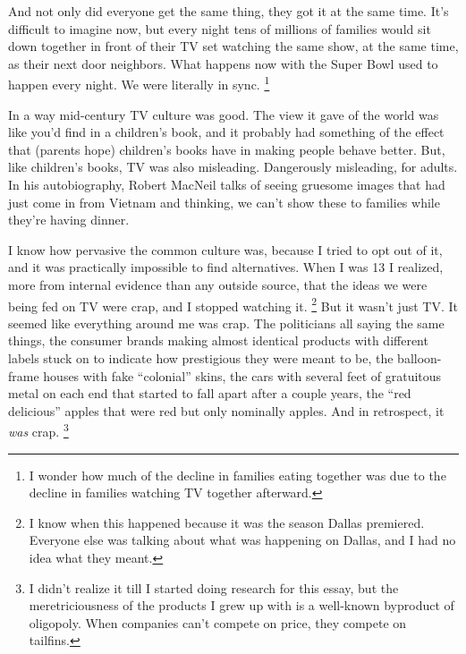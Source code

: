 And not only did everyone get the same thing, they got it at the same
time. It's difficult to imagine now, but every night tens of millions of
families would sit down together in front of their TV set watching the
same show, at the same time, as their next door neighbors. What happens
now with the Super Bowl used to happen every night. We were literally in
sync. \footnote{I wonder how much of the decline in families eating together was
due to the decline in families watching TV together afterward.}

In a way mid-century TV culture was good. The view it gave of the world
was like you'd find in a children's book, and it probably had something
of the effect that (parents hope) children's books have in making people
behave better. But, like children's books, TV was also misleading.
Dangerously misleading, for adults. In his autobiography, Robert MacNeil
talks of seeing gruesome images that had just come in from Vietnam and
thinking, we can't show these to families while they're having dinner.

I know how pervasive the common culture was, because I tried to opt out
of it, and it was practically impossible to find alternatives. When I
was 13 I realized, more from internal evidence than any outside source,
that the ideas we were being fed on TV were crap, and I stopped watching
it. \footnote{I know when this happened because it was the season Dallas
premiered. Everyone else was talking about what was happening on Dallas,
and I had no idea what they meant.} But it wasn't just TV. It seemed like
everything around me was crap. The politicians all saying the same
things, the consumer brands making almost identical products with
different labels stuck on to indicate how prestigious they were meant to
be, the balloon-frame houses with fake ``colonial'' skins, the cars with
several feet of gratuitous metal on each end that started to fall apart
after a couple years, the ``red delicious'' apples that were red but
only nominally apples. And in retrospect, it \emph{was} crap.
\footnote{I didn't realize it till I started doing research for this
essay, but the meretriciousness of the products I grew up with is a
well-known byproduct of oligopoly. When companies can't compete on
price, they compete on tailfins.}


